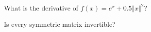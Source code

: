 \documentclass{amsart}
\begin{document}
\begin{category}
\begin{question}[essay]
What is the derivative of $f(x) = e^x + 0.5 \Vert x \Vert^2$?
\end{question}
\begin{question}[multichoice]
Is every symmetric matrix invertible?
\end{question}
\end{category}
\end{document}
